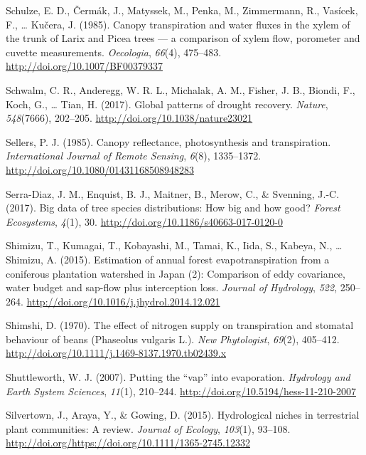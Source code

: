 \documentclass[11pt,twoside]{reedthesis}
\begin{document}
\hypertarget{ref-schulze_canopy_1985}{}
Schulze, E. D., Čermák, J., Matyssek, M., Penka, M., Zimmermann, R.,
Vasícek, F., \ldots{} Kučera, J. (1985). Canopy transpiration and water
fluxes in the xylem of the trunk of Larix and Picea trees --- a
comparison of xylem flow, porometer and cuvette measurements.
\emph{Oecologia}, \emph{66}(4), 475--483.
\url{http://doi.org/10.1007/BF00379337}

\hypertarget{ref-Schwalm2017}{}
Schwalm, C. R., Anderegg, W. R. L., Michalak, A. M., Fisher, J. B.,
Biondi, F., Koch, G., \ldots{} Tian, H. (2017). Global patterns of
drought recovery. \emph{Nature}, \emph{548}(7666), 202--205.
\url{http://doi.org/10.1038/nature23021}

\hypertarget{ref-Sellers1985}{}
Sellers, P. J. (1985). Canopy reflectance, photosynthesis and
transpiration. \emph{International Journal of Remote Sensing},
\emph{6}(8), 1335--1372. \url{http://doi.org/10.1080/01431168508948283}

\hypertarget{ref-serra-diaz_big_2017}{}
Serra-Diaz, J. M., Enquist, B. J., Maitner, B., Merow, C., \& Svenning,
J.-C. (2017). Big data of tree species distributions: How big and how
good? \emph{Forest Ecosystems}, \emph{4}(1), 30.
\url{http://doi.org/10.1186/s40663-017-0120-0}

\hypertarget{ref-Shimizu2015}{}
Shimizu, T., Kumagai, T., Kobayashi, M., Tamai, K., Iida, S., Kabeya,
N., \ldots{} Shimizu, A. (2015). Estimation of annual forest
evapotranspiration from a coniferous plantation watershed in Japan (2):
Comparison of eddy covariance, water budget and sap-flow plus
interception loss. \emph{Journal of Hydrology}, \emph{522}, 250--264.
\url{http://doi.org/10.1016/j.jhydrol.2014.12.021}

\hypertarget{ref-shimshi_effect_1970}{}
Shimshi, D. (1970). The effect of nitrogen supply on transpiration and
stomatal behaviour of beans (Phaseolus vulgaris L.). \emph{New
Phytologist}, \emph{69}(2), 405--412.
\url{http://doi.org/10.1111/j.1469-8137.1970.tb02439.x}

\hypertarget{ref-Shuttleworth2008}{}
Shuttleworth, W. J. (2007). Putting the ``vap'' into evaporation.
\emph{Hydrology and Earth System Sciences}, \emph{11}(1), 210--244.
\url{http://doi.org/10.5194/hess-11-210-2007}

\hypertarget{ref-Silvertown2015}{}
Silvertown, J., Araya, Y., \& Gowing, D. (2015). Hydrological niches in
terrestrial plant communities: A review. \emph{Journal of Ecology},
\emph{103}(1), 93--108.
\url{http://doi.org/https://doi.org/10.1111/1365-2745.12332}
\end{document}
